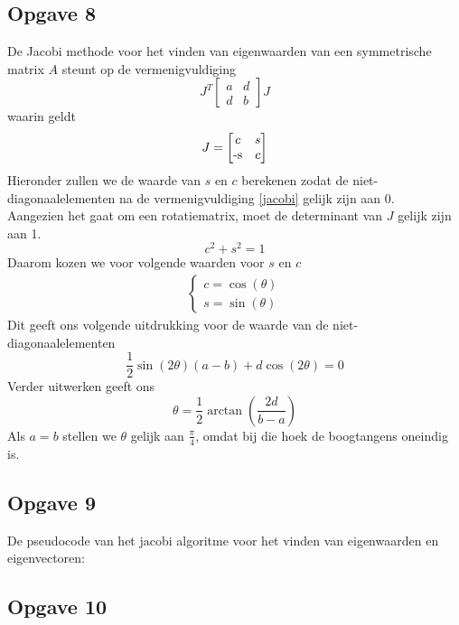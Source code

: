 \documentclass[a4paper, 12pt, titlepage]{report}
\begin{document}
\subsection{Opgave 8}
De Jacobi methode voor het vinden van eigenwaarden van een symmetrische matrix $A$ steunt op de vermenigvuldiging
\begin{equation} \label{jacobi}
 J^T\begin{bmatrix}a & d \\ d & b\end{bmatrix}J
\end{equation}
waarin geldt
\begin{equation}
 J=\begin{bmatrix}c & s\\ $-s$ & c\end{bmatrix}
\end{equation}
Hieronder zullen we de waarde van $s$ en $c$ berekenen zodat de niet-diagonaalelementen na de vermenigvuldiging \eqref{jacobi} gelijk zijn aan 0. \\
Aangezien het gaat om een rotatiematrix, moet de determinant van $J$ gelijk zijn aan 1.
\begin{equation}
 c^2+s^2=1
\end{equation}
Daarom kozen we voor volgende waarden voor $s$ en $c$
\begin{equation}
\begin{align}
 \begin{cases}
  c=\cos(\theta)\\
  s=\sin(\theta)
 \end{cases}
 \end{align}
\end{equation}
Dit geeft ons volgende uitdrukking voor de waarde van de niet-diagonaalelementen
\begin{equation}
 \frac{1}{2}\sin(2\theta)(a-b) + d\cos(2\theta) = 0
\end{equation}
Verder uitwerken geeft ons
\begin{equation}
 \theta = \frac{1}{2}\arctan(\frac{2d}{b-a})
\end{equation}
Als $a=b$ stellen we $\theta$ gelijk aan $\frac{\pi}{4}$, omdat bij die hoek de boogtangens oneindig is. 





\subsection{Opgave 9}
\begin{algorithmic}
 De pseudocode van het jacobi algoritme voor het vinden van eigenwaarden en eigenvectoren:
\end{algorithmic}

\subsection{Opgave 10}
\end{document}
